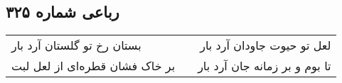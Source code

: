 \begin{center}
\section*{رباعی شماره ۳۲۵}
\label{sec:sh325}
\begin{longtable}{l p{0.5cm} r}
بستان رخ تو گلستان آرد بار
&&
لعل تو حیوت جاودان آرد بار
\\
بر خاک فشان قطره‌ای از لعل لبت
&&
تا بوم و بر زمانه جان آرد بار
\\
\end{longtable}
\end{center}
